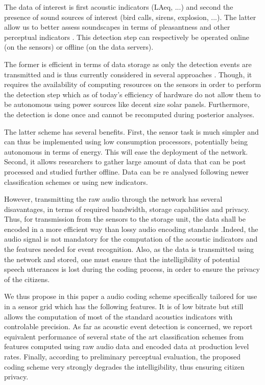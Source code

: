 \documentclass[final,3p,times,twocolumn]{elsarticle}
\begin{document}
The data of interest is first acoustic indicators (LAeq, ...) and second the presence of sound sources of interest (bird calls, sirens, explosion, ...). The latter allow us to better assess soundscapes in terms of pleasantness and other perceptual indicators \cite{lavandier2006contribution, aumond2017modeling}. This detection step can respectively be operated online (on the sensors) or offline (on the data servers).

The former is efficient in terms of data storage as only the detection events are transmitted and is thus currently considered in several approaches \cite{defreville2006automatic, mydlarz2017implementation, mydlarz2015design}. Though, it requires the availability of computing resources on the sensors in order to perform the detection step which as of today's efficiency of hardware do not allow them to be autonomous using power sources like decent size solar panels. Furthermore, the detection is done once and cannot be recomputed during posterior analyses.

The latter scheme has several benefits. First, the sensor task is much simpler and can thus be implemented using low consumption processors, potentially being autonomous in terms of energy. This will ease the deployment of the network. Second, it allows researchers to gather large amount of data that can be post processed and studied further offline. Data can be re analysed following newer classification schemes or using new indicators.

However, transmitting the raw audio through the network has several disavantages, in terms of required bandwidth, storage capabilities and privacy. Thus, for transmission from the sensors to the storage unit, the data shall be encoded in a more efficient way than lossy audio encoding standards \cite{pan1995tutorial}.Indeed, the audio signal is not mandatory for the computation of the acoustic indicators and the features needed for event recognition. Also, as the data is transmitted using the network and stored, one must ensure that the intelligibility of potential speech utterances is lost during the coding process, in order to ensure the privacy of the citizens.

We thus propose in this paper a audio coding scheme specifically tailored for use in a sensor grid which has the following features. It is of low bitrate but still allows the computation of most of the standard acoustics indicators with controlable precision. As far as acoustic event detection is concerned, we report equivalent performance of several state of the art classification schemes from features computed using raw audio data and encoded data at production level rates. Finally, according to preliminary perceptual evaluation, the proposed coding scheme very strongly degrades the intelligibility, thus ensuring citizen privacy.
\end{document}
